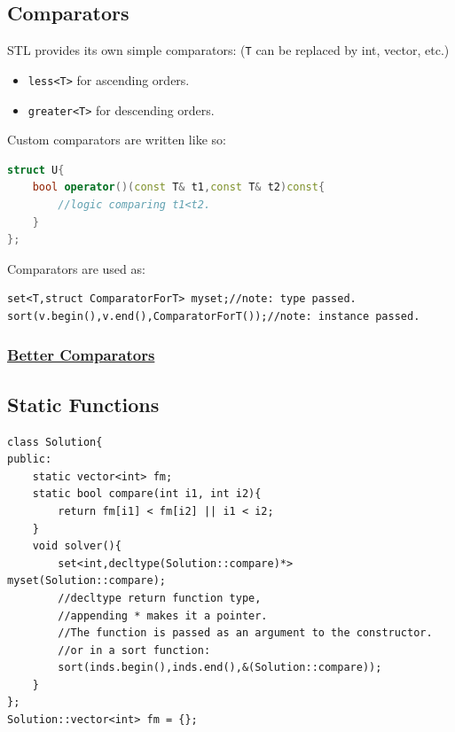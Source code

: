 \documentclass{report}
\begin{document}
\subsection{Comparators}
STL provides its own simple comparators: (\texttt{T} can be replaced by
int, vector, etc.)
\begin{itemize}
    \item \texttt{less<T>} for ascending orders.
    \item \texttt{greater<T>} for descending orders.
\end{itemize} Custom comparators are written like so:
\begin{lstlisting}[caption={Comparators},language=C++]
struct U{
    bool operator()(const T& t1,const T& t2)const{
        //logic comparing t1<t2.
    }
};
\end{lstlisting}
Comparators are used as:
\begin{lstlisting}
set<T,struct ComparatorForT> myset;//note: type passed.
sort(v.begin(),v.end(),ComparatorForT());//note: instance passed.
\end{lstlisting}
\subsubsection{\href{https://stackoverflow.com/a/46128321/14681493}{Better Comparators}}
\subsection*{Static Functions}
\begin{lstlisting}
class Solution{
public:
    static vector<int> fm;
    static bool compare(int i1, int i2){
        return fm[i1] < fm[i2] || i1 < i2;
    }
    void solver(){
        set<int,decltype(Solution::compare)*> myset(Solution::compare);
        //decltype return function type,
        //appending * makes it a pointer.
        //The function is passed as an argument to the constructor.
        //or in a sort function:
        sort(inds.begin(),inds.end(),&(Solution::compare));
    }
};
Solution::vector<int> fm = {};
\end{lstlisting}
\end{document}
